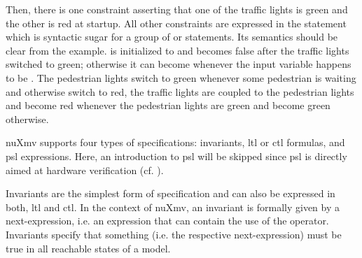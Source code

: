 \begin{example}
    Then, there is one  constraint asserting that one of the traffic lights is green and the other is red at startup.
    All other constraints are expressed in the  statement which is syntactic sugar for a group of  or  statements.
    Its semantics should be clear from the example.
     is initialized to  and becomes false after the traffic lights switched to green; otherwise it can become  whenever the input variable  happens to be .
    The pedestrian lights switch to green whenever some pedestrian is waiting and otherwise switch to red, the traffic lights are coupled to the pedestrian lights and become red whenever the pedestrian lights are green and become green otherwise.
\end{example}

nuXmv supports four types of specifications: invariants, \gls{ltl} or \gls{ctl} formulas, and \gls{psl} expressions.
Here, an introduction to \gls{psl} will be skipped since \gls{psl} is directly aimed at hardware verification (cf. \cite{Foster05}).

Invariants are the simplest form of specification and can also be expressed in both, \gls{ltl} and \gls{ctl}.
In the context of nuXmv, an invariant is formally given by a next-expression, i.e. an expression that can contain the use of the  operator.
Invariants specify that something (i.e. the respective next-expression) must be true in all reachable states of a model.

